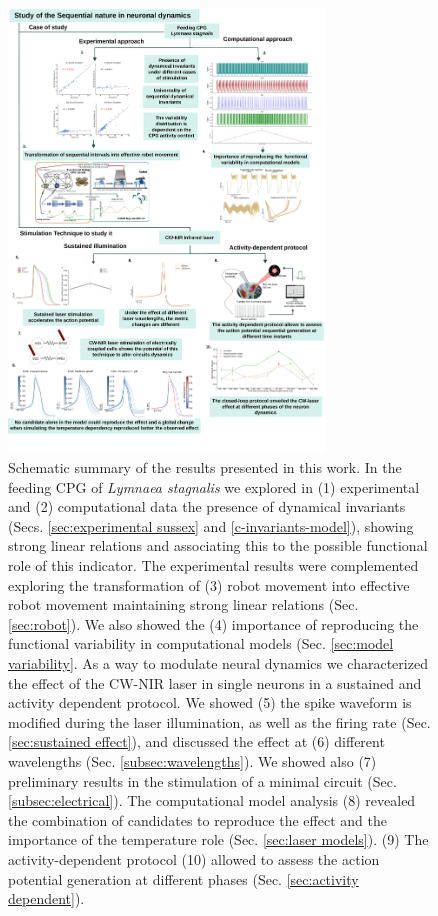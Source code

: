 \begin{figure}[htb!]
	\centering
	\includegraphics[width=0.75\textwidth]{img/panel_discussion_vertical_figures.pdf}
	\caption{Schematic summary of the results presented in this work. In the feeding CPG of \textit{Lymnaea stagnalis} we explored in (1) experimental and (2) computational data the presence of dynamical invariants (Secs. \ref{sec:experimental sussex} and \ref{c-invariants-model}), showing strong linear relations and associating this to the possible functional role of this indicator. The experimental results were complemented exploring the transformation of (3) robot movement into effective robot movement maintaining strong linear relations (Sec. \ref{sec:robot}). We also showed the (4) importance of reproducing the functional variability in computational models (Sec. \ref{sec:model variability}. As a way to modulate neural dynamics we characterized the effect of the CW-NIR laser in single neurons in a sustained and activity dependent protocol. We showed (5) the spike waveform is modified during the laser illumination, as well as the firing rate (Sec. \ref{sec:sustained effect}), and discussed the effect at (6) different wavelengths (Sec. \ref{subsec:wavelengths}). We showed also (7) preliminary results in the stimulation of a minimal circuit (Sec. \ref{subsec:electrical}). The computational model analysis (8) revealed the combination of candidates to reproduce the effect and the importance of the temperature role (Sec. \ref{sec:laser models}). (9) The activity-dependent protocol (10) allowed to assess the action potential generation at different phases (Sec. \ref{sec:activity dependent}).}
	\label{fig:discussion summary}
\end{figure}


